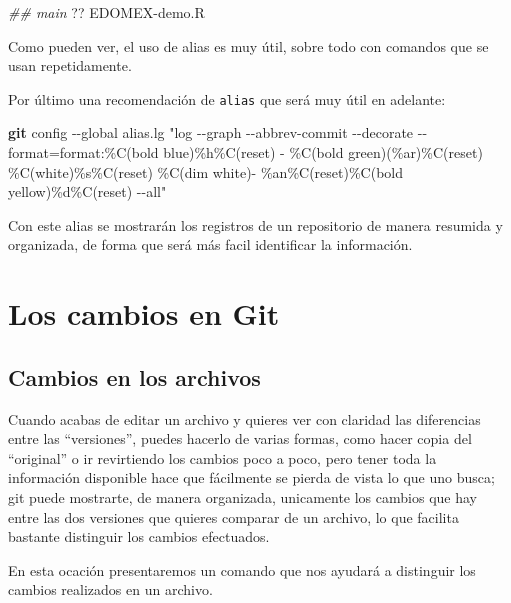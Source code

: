 \documentclass[
]{book}
\newenvironment{Shaded}{\begin{snugshade}}{\end{snugshade}}
\newcommand{\AttributeTok}[1]{\textcolor[rgb]{0.13,0.29,0.53}{#1}}
\newcommand{\CommentTok}[1]{\textcolor[rgb]{0.56,0.35,0.01}{\textit{#1}}}
\newcommand{\ExtensionTok}[1]{#1}
\newcommand{\FunctionTok}[1]{\textcolor[rgb]{0.13,0.29,0.53}{\textbf{#1}}}
\newcommand{\NormalTok}[1]{#1}
\newcommand{\StringTok}[1]{\textcolor[rgb]{0.31,0.60,0.02}{#1}}
\begin{document}
\begin{Shaded}
\begin{Highlighting}[]
\CommentTok{\#\# main}
\ExtensionTok{??}\NormalTok{ EDOMEX{-}demo.R}
\end{Highlighting}
\end{Shaded}

Como pueden ver, el uso de alias es muy útil, sobre todo con comandos que se usan repetidamente.

Por último una recomendación de \texttt{alias} que será muy útil en adelante:

\begin{Shaded}
\begin{Highlighting}[]
\FunctionTok{git}\NormalTok{ config }\AttributeTok{{-}{-}global}\NormalTok{ alias.lg }\StringTok{"log {-}{-}graph {-}{-}abbrev{-}commit {-}{-}decorate {-}{-}format=format:\textquotesingle{}\%C(bold blue)\%h\%C(reset) {-} \%C(bold green)(\%ar)\%C(reset) \%C(white)\%s\%C(reset) \%C(dim white){-} \%an\%C(reset)\%C(bold yellow)\%d\%C(reset)\textquotesingle{} {-}{-}all"}
\end{Highlighting}
\end{Shaded}

Con este alias se mostrarán los registros de un repositorio de manera resumida y organizada, de forma que será más facil identificar la información.

\chapter{Los cambios en Git}\label{los-cambios-en-git}

\section{Cambios en los archivos}\label{cambios-en-los-archivos}

Cuando acabas de editar un archivo y quieres ver con claridad las diferencias entre las ``versiones'', puedes hacerlo de varias formas, como hacer copia del ``original'' o ir revirtiendo los cambios poco a poco, pero tener toda la información disponible hace que fácilmente se pierda de vista lo que uno busca;
git puede mostrarte, de manera organizada, unicamente los cambios que hay entre las dos versiones que quieres comparar de un archivo, lo que facilita bastante distinguir los cambios efectuados.

En esta ocación presentaremos un comando que nos ayudará a distinguir los cambios realizados en un archivo.
\end{document}
